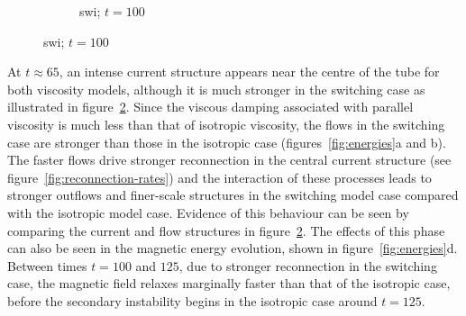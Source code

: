 \begin{figure}[t]
\begin{subfigure}[t]{0.32\textwidth}
    \caption{swi; $t=100$}
    \label{fig:final_switching_current_density_0020}
  \end{subfigure}

  \label{fig:turning-point}
\end{figure}

At $t\approx65$, an intense current structure appears near the centre of the
tube for both viscosity models, although it is much stronger in the
switching case as illustrated in figure~\ref{fig:turning-point}. Since the viscous damping associated with parallel viscosity is much less than that of isotropic viscosity, the flows in the switching case are stronger than those in the isotropic case (figures~\ref{fig:energies}a and b). The faster flows drive stronger reconnection in the central current structure (see figure~\ref{fig:reconnection-rates}) and the interaction of these processes leads to stronger outflows and finer-scale structures in the switching model case compared with the isotropic model case. Evidence of this behaviour can be seen by comparing the current and flow structures in figure~\ref{fig:turning-point}. The effects of this phase can also be seen in the magnetic energy evolution, shown in figure~\ref{fig:energies}d. Between times $t=100$ and $125$, due to stronger reconnection in the switching case, the magnetic field relaxes marginally faster than that of the isotropic case, before the secondary instability begins in the isotropic case around $t=125$.


